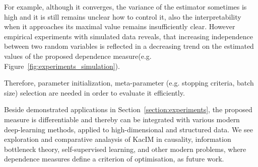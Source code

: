 \documentclass{article}
\begin{document}
{For example, although it converges, the variance of the estimator sometimes is high and it is still remains unclear how to control it, also the interpretability when it approaches its maximal value remains insufficiently clear. However empirical experiments with simulated data reveals, that increasing independence between two random variables is reflected in a decreasing trend on the estimated values of the proposed dependence measure(e.g. Figure~\ref{fig:experiments_simulation}). 

 Therefore, parameter initialization, meta-parameter (e.g. stopping criteria, batch size) selection are needed in order to evaluate it efficiently.

Beside demonstrated applications in Section~\ref{section:experiments}, the proposed measure is differentiable and thereby can be integrated with various modern deep-learning methods, applied to high-dimensional and structured data. We see exploration and comparative analaysis of KacIM in causality, information bottleneck theory, self-supervised learning, and other modern problems, where dependence measures define a criterion of optimisation, as future work. %


}
\end{document}
